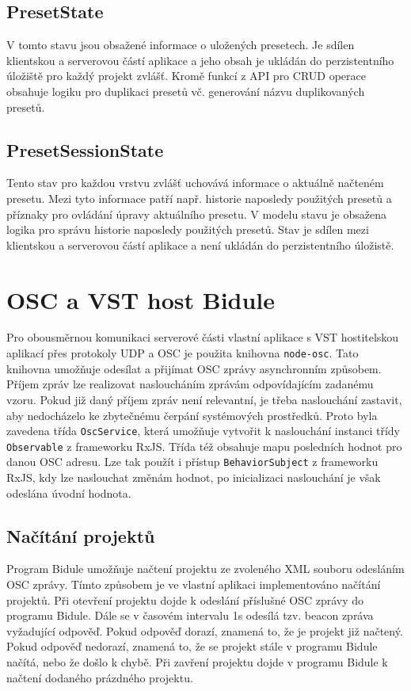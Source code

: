 \documentclass[thesis=M,czech]{FITthesis}[2019/03/06]
\begin{document}
		\subsection{PresetState}
			V tomto stavu jsou obsažené informace o uložených presetech. Je sdílen klientskou a serverovou částí aplikace a jeho obsah je ukládán do perzistentního úložiště pro každý projekt zvlášť.
			Kromě funkcí z API pro CRUD operace obsahuje logiku pro duplikaci presetů vč. generování
			názvu duplikovaných presetů.
			
		\subsection{PresetSessionState}
			Tento stav pro každou vrstvu zvlášť uchovává informace o aktuálně načteném presetu.
			Mezi tyto informace patří např. historie naposledy použitých presetů a příznaky pro 
			ovládání úpravy aktuálního presetu. V modelu stavu je obsažena logika pro správu historie naposledy použitých presetů.
			Stav je sdílen mezi klientskou a serverovou částí aplikace a není ukládán do perzistentního úložistě.
		
	\section{OSC a VST host Bidule}
		
		Pro obousměrnou komunikaci serverové části vlastní aplikace s VST hostitelskou aplikací přes protokoly UDP a OSC je použita knihovna \texttt{node-osc}.
		Tato knihovna umožňuje odesílat a přijímat OSC zprávy asynchronním způsobem. Příjem zpráv lze realizovat 
		nasloucháním zprávám odpovídajícím zadanému vzoru. Pokud již daný příjem zpráv není relevantní, je třeba naslouchání zastavit,
		aby nedocházelo ke zbytečnému čerpání systémových prostředků. Proto byla zavedena třída \texttt{OscService}, která 
		umožňuje vytvořit k naslouchání instanci třídy \texttt{Observable} z frameworku RxJS. Třída též obsahuje 
		mapu posledních hodnot pro danou OSC adresu. Lze tak použít i přístup \texttt{BehaviorSubject} z frameworku RxJS,
		kdy lze naslouchat změnám hodnot, po inicializaci naslouchání je však odeslána úvodní hodnota.
		
		\subsection{Načítání projektů}
		Program Bidule umožňuje načtení projektu ze zvoleného XML souboru odesláním OSC zprávy. Tímto způsobem
		je ve vlastní aplikaci implementováno načítání projektů. Při otevření projektu dojde k odeslání příslušné
		OSC zprávy do programu Bidule. Dále se v časovém intervalu 1s odesílá tzv. beacon zpráva vyžadující odpověď.
		Pokud odpověď dorazí, znamená to, že je projekt již načtený. Pokud odpověď nedorazí, znamená to, že se projekt stále v programu Bidule načítá,	nebo že došlo k chybě. Při zavření projektu dojde v programu Bidule k načtení dodaného prázdného projektu.
	
\end{document}
